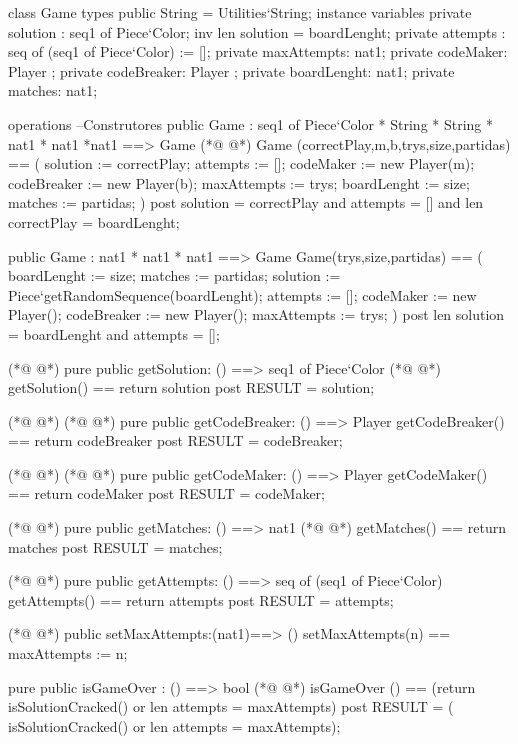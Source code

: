 \begin{vdmpp}[breaklines=true]
class Game
types
  public String = Utilities`String;
instance variables
   private solution : seq1 of Piece`Color;
   inv len solution = boardLenght;
   private attempts : seq of (seq1 of Piece`Color) := [];
   private maxAttempts: nat1;   
   private codeMaker:  Player ;
   private codeBreaker:  Player ;    
   private boardLenght: nat1;
   private matches: nat1;   
   
operations
--Construtores
  public Game : seq1 of Piece`Color * String * String * nat1 * nat1 *nat1 ==> Game
(*@
\label{Game:17}
@*)
  Game (correctPlay,m,b,trys,size,partidas) == (
   solution := correctPlay;
   attempts := [];
   codeMaker := new Player(m);
   codeBreaker := new Player(b);
   maxAttempts := trys;
   boardLenght := size;
   matches := partidas;
  )
  post solution = correctPlay and
   attempts = [] and len correctPlay = boardLenght; 
  
  public Game : nat1 * nat1 * nat1 ==> Game
  Game(trys,size,partidas) == (
  boardLenght := size;
  matches := partidas;
   solution := Piece`getRandomSequence(boardLenght);
   attempts := [];
   codeMaker := new Player();
   codeBreaker := new Player();
   maxAttempts := trys;   
  )
  post len solution = boardLenght and attempts = []; 

(*@
\label{getSolution:41}
@*)
  pure public getSolution: () ==> seq1 of Piece`Color
(*@
\label{setMaxAttempts:42}
@*)
  getSolution() == return solution
  post RESULT = solution;
  
(*@
\label{isGameOver:45}
@*)
(*@
\label{getCodeBreaker:45}
@*)
  pure public getCodeBreaker: () ==> Player
  getCodeBreaker() == return codeBreaker
  post RESULT = codeBreaker;
  
(*@
\label{winGame:49}
@*)
(*@
\label{getCodeMaker:49}
@*)
  pure public getCodeMaker: () ==> Player
  getCodeMaker() == return codeMaker
  post RESULT = codeMaker;
  
(*@
\label{getMatches:53}
@*)
  pure public getMatches: () ==> nat1
(*@
\label{changePlayer:54}
@*)
  getMatches() == return matches
  post RESULT = matches;
  
(*@
\label{getAttempts:57}
@*)
  pure public getAttempts: () ==> seq of (seq1 of Piece`Color)
  getAttempts() == return attempts
  post RESULT = attempts;

(*@
\label{isSolutionCracked:61}
@*)
  public setMaxAttempts:(nat1)==> () 
  setMaxAttempts(n) == maxAttempts := n;
  
  pure public isGameOver : () ==> bool
(*@
\label{makeAPlay:65}
@*)
   isGameOver () == (return isSolutionCracked() or len attempts = maxAttempts)  
  post RESULT = ( isSolutionCracked() or len attempts = maxAttempts);
  

\end{vdmpp}
